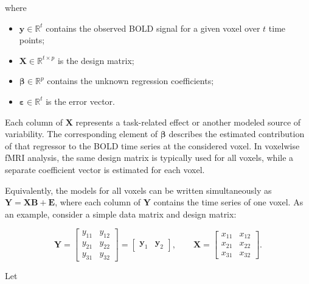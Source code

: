 \documentclass[english]{pwr_wmat_praca_dyplomowa}
\theoremstyle{definition}
\theoremstyle{remark}
\begin{document}
where

\begin{itemize}
    \item $\mathbf{y} \in \mathbb{R}^{t}$ contains the observed BOLD signal for a given voxel over $t$ time points;
    \item $\mathbf{X} \in \mathbb{R}^{t \times p}$ is the design matrix;
    \item $\boldsymbol{\beta} \in \mathbb{R}^{p}$ contains the unknown regression coefficients;
    \item $\boldsymbol{\varepsilon} \in \mathbb{R}^{t}$ is the error vector.
\end{itemize}

Each column of $\mathbf{X}$ represents a task-related effect or another modeled source of variability. The corresponding element of $\boldsymbol{\beta}$ describes the estimated contribution of that regressor to the BOLD time series at the considered voxel. In voxelwise fMRI analysis, the same design matrix is typically used for all voxels, while a separate coefficient vector is estimated for each voxel.

Equivalently, the models for all voxels can be written simultaneously as $\mathbf{Y} = \mathbf{X} \mathbf{B} + \mathbf{E}$, where each column of $\mathbf{Y}$ contains the time series of one voxel. As an example, consider a simple data matrix and design matrix:

\begin{equation}
    \mathbf{Y} = 
    \begin{bmatrix}
        y_{11} & y_{12} \\
        y_{21} & y_{22} \\
        y_{31} & y_{32}
    \end{bmatrix}
    =
    \begin{bmatrix}
        \mathbf{y}_1 & \mathbf{y}_2
    \end{bmatrix}, \qquad
    \mathbf{X} =
    \begin{bmatrix}
        x_{11} & x_{12} \\
        x_{21} & x_{22} \\
        x_{31} & x_{32}
    \end{bmatrix}.
\end{equation}

\newpage
Let 
\end{document}
